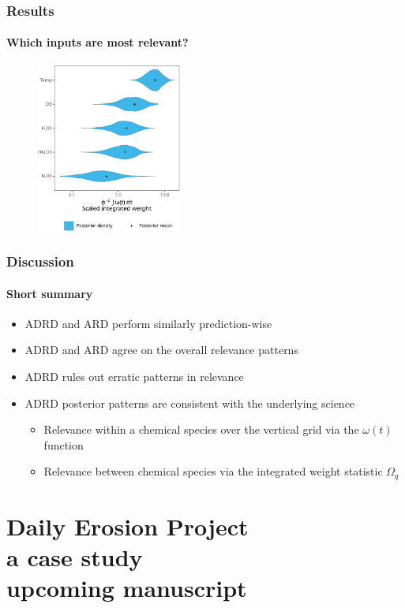 \documentclass{snedecorbeamer}
\begin{document}
\begin{frame}
  \frametitle{Results}
  \framesubtitle{Which inputs are most relevant?}

  \begin{figure}
    \centering
    \includegraphics[height=15em]{inc/mls_weight_integral.pdf}
  \end{figure}

\end{frame}

\begin{frame}
  \frametitle{Discussion}
  \framesubtitle{Short summary}

  \begin{itemize}
  \item ADRD and ARD perform similarly prediction-wise
  \item ADRD and ARD agree on the overall relevance patterns
  \item ADRD rules out erratic patterns in relevance
  \item ADRD posterior patterns are consistent with the underlying science
    \begin{itemize}
    \item Relevance within a chemical species over the vertical grid via the
      $\omega(t)$ function
    \item Relevance between chemical species via the integrated weight statistic
      $\Omega_q$
    \end{itemize}
  \end{itemize}
\end{frame}

\section{Daily Erosion Project \\ {\small a case study} \\
  {\tiny upcoming manuscript}}
\end{document}
